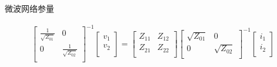 \begin{frame}{微波网络参量}
\begin{enumerate}
              \begin{gather*}
                  \begin{bmatrix*}
                      \frac{1}{\sqrt{Z_{01}}} & 0\\
                      0 & \frac{1}{\sqrt{Z_{02}}}\\
                  \end{bmatrix*}^{-1}
                  \begin{bmatrix*}
                      v_1 \\
                      v_2 \\
                  \end{bmatrix*}
                  =
                  \begin{bmatrix*}
                      Z_{11} & Z_{12}\\
                      Z_{21} & Z_{22}\\
                  \end{bmatrix*}
                  \begin{bmatrix*}
                      \sqrt{Z_{01}} & 0\\
                      0 & \sqrt{Z_{02}}\\
                  \end{bmatrix*}^{-1}
                  \begin{bmatrix*}
                      i_1\\
                      i_2\\
                  \end{bmatrix*}
              \end{gather*}
    \end{enumerate}
\end{frame}

